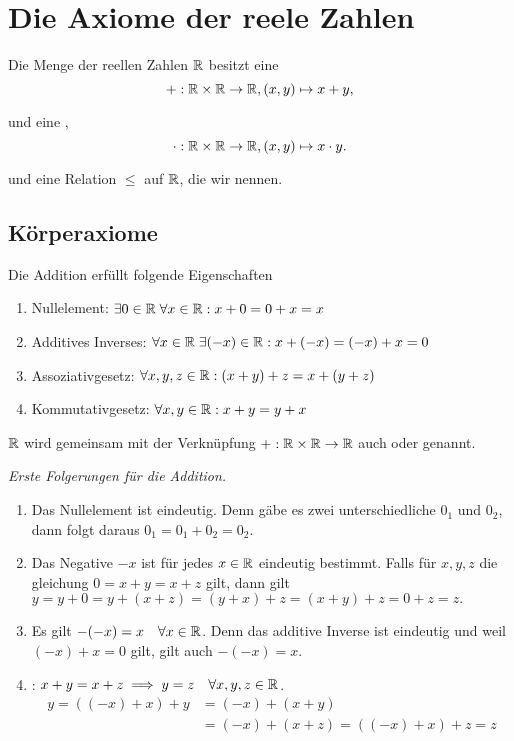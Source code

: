 \section{Die Axiome der reele Zahlen}

\begin{mydef}
  Die Menge der reellen Zahlen $\mathbb{R}$ besitzt eine 
  \[
    +: \mathbb{R} \times \mathbb{R} \to \mathbb{R}, (x,y) \mapsto x+y,
  \]

  und eine ,
  \[
    \cdot: \mathbb{R} \times \mathbb{R} \to \mathbb{R}, (x,y) \mapsto x\cdot y.
  \]

  und eine Relation $\leq$ auf $\mathbb{R}$, die wir  nennen.
\end{mydef}

\subsection{Körperaxiome}

Die Addition erfüllt folgende Eigenschaften
\begin{enumerate}[label=\textbf{(\alph*)}]
  \item Nullelement: $\exists 0 \in \mathbb{R} \; \forall x \in \mathbb{R}: x + 0 = 0 + x = x$
  \item Additives Inverses: $\forall x \in \mathbb{R} \; \exists (-x) \in \mathbb{R}: x + (-x) = (-x) + x = 0$
  \item Assoziativgesetz: $\forall x,y,z \in \mathbb{R}: (x+y)+z = x+(y+z)$
  \item Kommutativgesetz: $\forall x,y \in \mathbb{R}: x+y = y + x$
\end{enumerate}
$\mathbb{R}$ wird gemeinsam mit der Verknüpfung $+: \mathbb{R} \times \mathbb{R} \to \mathbb{R}$ auch  oder  genannt.

\emph{Erste Folgerungen für die Addition.}
\begin{enumerate}
  \item Das Nullelement ist eindeutig. Denn gäbe es zwei unterschiedliche $0_1$ und $0_2$, dann folgt daraus $0_1 = 0_1 + 0_2 = 0_2$.
  \item Das Negative $-x$ ist für jedes $x \in \mathbb{R}$ eindeutig bestimmt. Falls für $x,y,z$ die gleichung $0=x+y=x+z$ gilt, dann gilt $y=y+0=y+(x+z)=(y+x)+z=(x+y)+z=0+z=z.$
  \item Es gilt $-(-x) = x \quad \forall x \in \mathbb{R}$. Denn das additive Inverse ist eindeutig und weil $(-x) + x = 0$ gilt, gilt auch $-(-x) = x$.
  \item {}: $x + y = x + z \implies y=z \quad \forall x,y,z \in \mathbb{R}$.
  \[
    \begin{aligned}
      y = ((-x)+x)+y &= (-x)+(x+y) \\
      &=(-x)+(x+z) = ((-x)+x)+z = z
    \end{aligned}
  \]
\end{enumerate}

